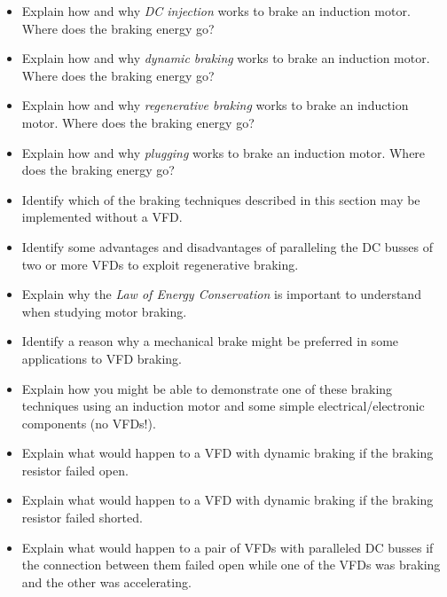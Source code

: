 \begin{itemize}
\item{} Explain how and why {\it DC injection} works to brake an induction motor.  Where does the braking energy go?
\item{} Explain how and why {\it dynamic braking} works to brake an induction motor.  Where does the braking energy go?
\item{} Explain how and why {\it regenerative braking} works to brake an induction motor.  Where does the braking energy go?
\item{} Explain how and why {\it plugging} works to brake an induction motor.  Where does the braking energy go?
\item{} Identify which of the braking techniques described in this section may be implemented without a VFD.
\item{} Identify some advantages and disadvantages of paralleling the DC busses of two or more VFDs to exploit regenerative braking.
\item{} Explain why the {\it Law of Energy Conservation} is important to understand when studying motor braking.
\item{} Identify a reason why a mechanical brake might be preferred in some applications to VFD braking.
\item{} Explain how you might be able to demonstrate one of these braking techniques using an induction motor and some simple electrical/electronic components (no VFDs!).
\item{} Explain what would happen to a VFD with dynamic braking if the braking resistor failed open.
\item{} Explain what would happen to a VFD with dynamic braking if the braking resistor failed shorted.
\item{} Explain what would happen to a pair of VFDs with paralleled DC busses if the connection between them failed open while one of the VFDs was braking and the other was accelerating.
\end{itemize}




